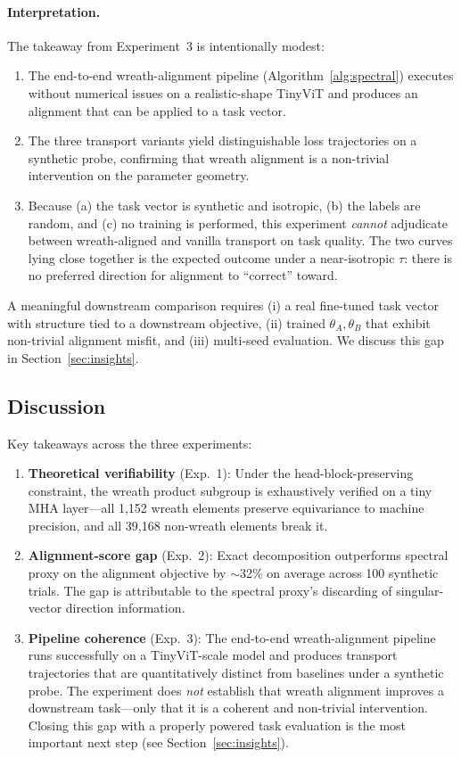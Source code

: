 \paragraph{Interpretation.} The takeaway from Experiment~3 is intentionally modest:
\begin{enumerate}[label=(\arabic*),nosep]
    \item The end-to-end wreath-alignment pipeline (Algorithm~\ref{alg:spectral}) executes without numerical issues on a realistic-shape TinyViT and produces an alignment that can be applied to a task vector.
    \item The three transport variants yield distinguishable loss trajectories on a synthetic probe, confirming that wreath alignment is a non-trivial intervention on the parameter geometry.
    \item Because (a) the task vector is synthetic and isotropic, (b) the labels are random, and (c) no training is performed, this experiment \emph{cannot} adjudicate between wreath-aligned and vanilla transport on task quality. The two curves lying close together is the expected outcome under a near-isotropic $\tau$: there is no preferred direction for alignment to ``correct'' toward.
\end{enumerate}
A meaningful downstream comparison requires (i) a real fine-tuned task vector with structure tied to a downstream objective, (ii) trained $\theta_A, \theta_B$ that exhibit non-trivial alignment misfit, and (iii) multi-seed evaluation. We discuss this gap in Section~\ref{sec:insights}.

\subsection{Discussion}

Key takeaways across the three experiments:
\begin{enumerate}[label=(\arabic*)]
    \item \textbf{Theoretical verifiability} (Exp.~1): Under the head-block-preserving constraint, the wreath product subgroup is exhaustively verified on a tiny MHA layer---all 1,152 wreath elements preserve equivariance to machine precision, and all 39,168 non-wreath elements break it.
    \item \textbf{Alignment-score gap} (Exp.~2): Exact decomposition outperforms spectral proxy on the alignment objective by $\sim$32\% on average across 100 synthetic trials. The gap is attributable to the spectral proxy's discarding of singular-vector direction information.
    \item \textbf{Pipeline coherence} (Exp.~3): The end-to-end wreath-alignment pipeline runs successfully on a TinyViT-scale model and produces transport trajectories that are quantitatively distinct from baselines under a synthetic probe. The experiment does \emph{not} establish that wreath alignment improves a downstream task---only that it is a coherent and non-trivial intervention. Closing this gap with a properly powered task evaluation is the most important next step (see Section~\ref{sec:insights}).
\end{enumerate}
